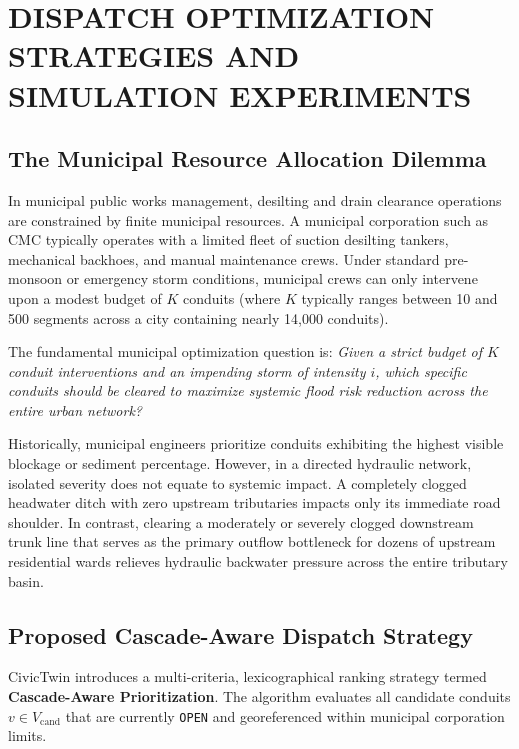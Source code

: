 \documentclass[12pt,a4paper]{report}
\begin{document}

\chapter{DISPATCH OPTIMIZATION STRATEGIES AND SIMULATION EXPERIMENTS}

\section{The Municipal Resource Allocation Dilemma}
In municipal public works management, desilting and drain clearance operations are constrained by finite municipal resources. A municipal corporation such as CMC typically operates with a limited fleet of suction desilting tankers, mechanical backhoes, and manual maintenance crews. Under standard pre-monsoon or emergency storm conditions, municipal crews can only intervene upon a modest budget of $K$ conduits (where $K$ typically ranges between 10 and 500 segments across a city containing nearly 14,000 conduits).

The fundamental municipal optimization question is: \textit{Given a strict budget of $K$ conduit interventions and an impending storm of intensity $i$, which specific conduits should be cleared to maximize systemic flood risk reduction across the entire urban network?}

Historically, municipal engineers prioritize conduits exhibiting the highest visible blockage or sediment percentage. However, in a directed hydraulic network, isolated severity does not equate to systemic impact. A completely clogged headwater ditch with zero upstream tributaries impacts only its immediate road shoulder. In contrast, clearing a moderately or severely clogged downstream trunk line that serves as the primary outflow bottleneck for dozens of upstream residential wards relieves hydraulic backwater pressure across the entire tributary basin.

\section{Proposed Cascade-Aware Dispatch Strategy}
CivicTwin introduces a multi-criteria, lexicographical ranking strategy termed \textbf{Cascade-Aware Prioritization}. The algorithm evaluates all candidate conduits $v \in V_{\text{cand}}$ that are currently \texttt{OPEN} and georeferenced within municipal corporation limits. 
\end{document}

